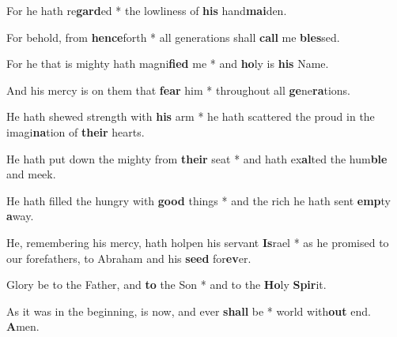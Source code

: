 \begin{multicols}{2}
	For he hath re\textbf{gard}ed * the lowliness of \textbf{his} hand\textbf{mai}den.
	
	For behold, from \textbf{hence}forth * all generations shall \textbf{call} me \textbf{bles}sed.
	
	For he that is mighty hath magni\textbf{fied} me * and \textbf{ho}ly is \textbf{his} Name.
	
	And his mercy is on them that \textbf{fear} him * throughout all \textbf{ge}ne\textbf{ra}tions.
	
	He hath shewed strength with \textbf{his} arm * he hath scattered the proud in the imagi\textbf{na}tion of \textbf{their} hearts.
	
	He hath put down the mighty from \textbf{their} seat * and hath ex\textbf{al}ted the hum\textbf{ble} and meek.
	
	He hath filled the hungry with \textbf{good} things * and the rich he hath sent \textbf{emp}ty \textbf{a}way.
	
	He, remembering his mercy, hath holpen his servant \textbf{Is}rael * as he promised to our forefathers, to Abraham and his \textbf{seed} for\textbf{ev}er.
	
	Glory be to the Father, and \textbf{to} the Son * and to the \textbf{Ho}ly \textbf{Spir}it.
	
	As it was in the beginning, is now, and ever \textbf{shall} be * world with\textbf{out} end. \textbf{A}men.
\end{multicols}